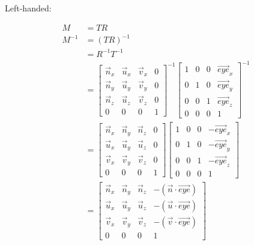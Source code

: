   Left-handed:

  \begin{align}
    M &= T R \\
    M^{-1} &= \left( T R \right)^{-1} \\
    &= R^{-1} T^{-1} \\
    &=
    \begin{bmatrix}
      \vec{n}_{x} & \vec{u}_{x} & \vec{v}_{x} & 0 \\
      \vec{n}_{y} & \vec{u}_{y} & \vec{v}_{y} & 0 \\
      \vec{n}_{z} & \vec{u}_{z} & \vec{v}_{z} & 0 \\
      0 & 0 & 0 & 1
    \end{bmatrix}^{-1}
    \begin{bmatrix}
      1 & 0 & 0 & \vec{eye}_{x} \\
      0 & 1 & 0 & \vec{eye}_{y} \\
      0 & 0 & 1 & \vec{eye}_{z} \\
      0 & 0 & 0 & 1
    \end{bmatrix}^{-1} \\
    &=
    \begin{bmatrix}
      \vec{n}_{x} & \vec{n}_{y} & \vec{n}_{z} & 0 \\
      \vec{u}_{x} & \vec{u}_{y} & \vec{u}_{z} & 0 \\
      \vec{v}_{x} & \vec{v}_{y} & \vec{v}_{z} & 0 \\
      0 & 0 & 0 & 1
    \end{bmatrix}
    \begin{bmatrix}
      1 & 0 & 0 & -\vec{eye}_{x} \\
      0 & 1 & 0 & -\vec{eye}_{y} \\
      0 & 0 & 1 & -\vec{eye}_{z} \\
      0 & 0 & 0 & 1
    \end{bmatrix} \\
    &=
    \begin{bmatrix}
      \vec{n}_{x} & \vec{n}_{y} & \vec{n}_{z} & -\left( \vec{n} \cdot \vec{eye} \right) \\
      \vec{u}_{x} & \vec{u}_{y} & \vec{u}_{z} & -\left( \vec{u} \cdot \vec{eye} \right) \\
      \vec{v}_{x} & \vec{v}_{y} & \vec{v}_{z} & -\left( \vec{v} \cdot \vec{eye} \right) \\
      0 & 0 & 0 & 1
    \end{bmatrix}
  \end{align}

